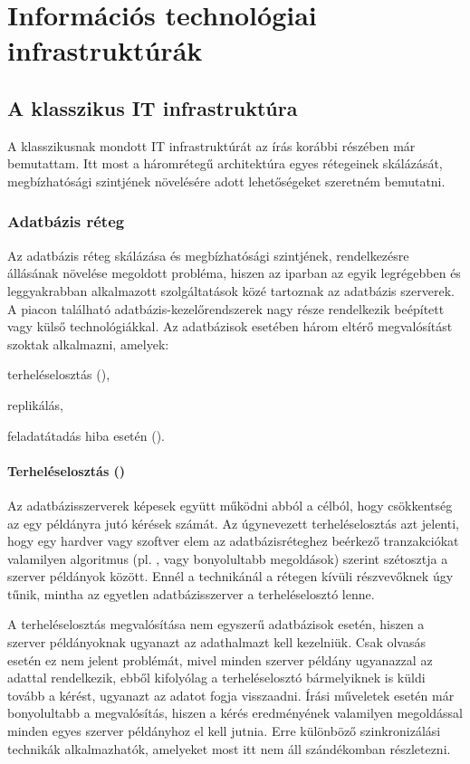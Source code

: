 \chapter{Információs technológiai infrastruktúrák}
\section{A klasszikus IT infrastruktúra}
A klasszikusnak mondott IT infrastruktúrát az írás korábbi részében már bemutattam. Itt most a háromrétegű architektúra egyes rétegeinek skálázását, megbízhatósági szintjének növelésére adott lehetőségeket szeretném bemutatni.
\subsection{Adatbázis réteg}
Az adatbázis réteg skálázása és megbízhatósági szintjének, rendelkezésre állásának növelése megoldott probléma, hiszen az iparban az egyik legrégebben és leggyakrabban alkalmazott szolgáltatások közé tartoznak az adatbázis szerverek. A piacon található adatbázis-kezelőrendszerek nagy része rendelkezik beépített vagy külső technológiákkal.
Az adatbázisok esetében három eltérő megvalósítást szoktak alkalmazni, amelyek\cite{mizofr}:
\begin{sajat_itemize}
\item terheléselosztás (),
\item replikálás,
\item feladatátadás hiba esetén ().
\end{sajat_itemize}

\subsubsection{Terheléselosztás ()}

Az adatbázisszerverek képesek együtt működni abból a célból, hogy csökkentség az egy példányra jutó kérések számát. Az úgynevezett terheléselosztás azt jelenti, hogy egy hardver vagy szoftver elem az adatbázisréteghez beérkező tranzakciókat valamilyen algoritmus (pl. , vagy bonyolultabb megoldások) szerint szétosztja a szerver példányok között. Ennél a technikánál a rétegen kívüli részvevőknek úgy tűnik, mintha az egyetlen adatbázisszerver a terheléselosztó lenne.

A terheléselosztás megvalósítása nem egyszerű adatbázisok esetén, hiszen a szerver példányoknak ugyanazt az adathalmazt kell kezelniük. Csak olvasás esetén ez nem jelent problémát, mivel minden szerver példány ugyanazzal az adattal rendelkezik, ebből kifolyólag a terheléselosztó bármelyiknek is küldi tovább a kérést, ugyanazt az adatot fogja visszaadni.
Írási műveletek esetén már bonyolultabb a megvalósítás, hiszen a kérés eredményének valamilyen megoldással minden egyes szerver példányhoz el kell jutnia. Erre különböző szinkronizálási technikák alkalmazhatók, amelyeket most itt nem áll szándékomban részletezni.

